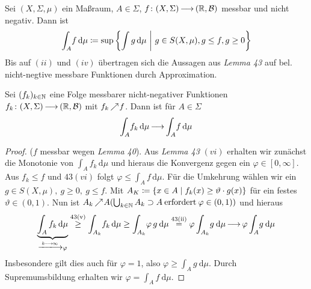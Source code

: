 \documentclass[skript.tex]{subfiles}
\begin{document}
	\begin{defin}[Integral]
		Sei $(X,\Sigma,\mu)$ ein Maßraum, $A\in\Sigma$, $f\colon(X,\Sigma)\kern -1pt \longrightarrow \kern -1pt(\mathbb{R},\mathcal{B})$ messbar und nicht negativ. Dann ist
	\begin{equation*}
		\int_{A} \! f \, \mathrm{d}\mu\coloneqq \sup \left\{\int g \, \mathrm{d}\mu\ \middle|\ g\in S(X,\mu),g \le f, g\geq 0\right\}
	\end{equation*}
	Bis auf $(ii)$ und $(iv)$ übertragen sich die Aussagen aus \textit{Lemma 43} auf bel. nicht-negtive messbare Funktionen durch Approximation.
	\end{defin}

	\begin{theorem}
		Sei $(f_k)_{k\in\mathbb{N}}$ eine Folge messbarer nicht-negativer Funktionen $f_k\colon(X,\Sigma)\kern -1pt \longrightarrow \kern -1pt(\mathbb{R},\mathcal{B})$ mit $f_k \kern -1pt \nearrow \kern -2pt f$. Dann ist für $A\in\Sigma$
		\begin{equation*}
			\int_{A} \! f_k \, \mathrm{d}\mu \kern -1pt \longrightarrow \kern -1pt \int_{A} \! f \, \mathrm{d}\mu
		\end{equation*}
	\end{theorem}

	\begin{proof}
		($f$ messbar wegen \textit{Lemma 40}). Aus \textit{Lemma 43} $(vi)$ erhalten wir zunächst die Monotonie von $\int_{A} \! f_k \, \mathrm{d}\mu$ und hieraus die Konvergenz gegen ein $\varphi \in [0,\infty]$. Aus $f_k\leq f$ und $43(vi)$ folgt $\varphi\leq\int_{A} \! f \, \mathrm{d}\mu$. Für die Umkehrung wählen wir ein $g\in S(X,\mu), \: g\geq0, \: g\leq f$. Mit $A_K \coloneqq \{x\in A\mid f_k(x)\geq \vartheta \cdot g(x)\}$ für ein festes $\vartheta\in (0,1)$. Nun ist $A_k \kern -1pt \nearrow \kern -2pt A \\(\bigcup_{k\in\mathbb{N}}A_k \supset A \: \mathrm{erfordert} \: \varphi\in(0,1)) $ und hieraus
		\begin{equation*}
			\underbrace{\int_A f_k \, \mathrm{d}\mu}_{\xlongrightarrow{k\lra\infty}\varphi} \stackrel{\text{43(v)}}{\geq}\int_{A_k} \! f_k \,\mathrm{d}\mu\geq\int_{A_k} \! \varphi \, g \: \mathrm{d}\mu\stackrel{\text{43(ii)}}{=}\varphi\int_{A_k} \! g \: \mathrm{d}\mu \lra \varphi\int_A \! g \: \mathrm{d}\mu
		\end{equation*}
		Insbesondere gilt dies auch für $\varphi=1$, also $\varphi\geq\int_A \! g \: \mathrm{d}\mu$. Durch Supremumsbildung erhalten wir $\varphi=\int_A \! f \: \mathrm{d}\mu$.
	\end{proof}
\end{document}
